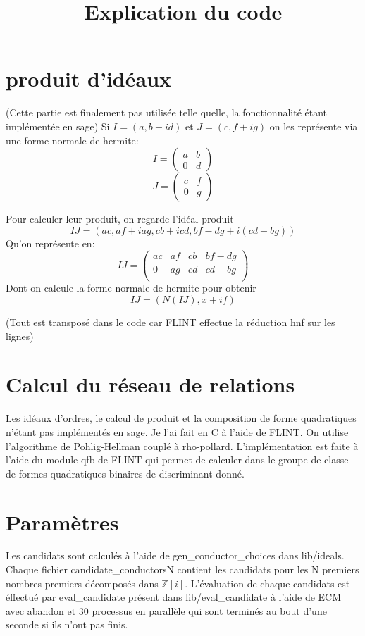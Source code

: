 \documentclass[12pt]{article}
\theoremstyle{plain}
\theoremstyle{definition}
\newcommand{\Z}{\mathbb{Z}}
\begin{document}
\title{Explication du code}
\maketitle
\section{produit d'idéaux}
(Cette partie est finalement pas utilisée telle quelle, la fonctionnalité étant implémentée en sage)
Si $I=(a, b+id)$ et $J=(c, f+ig)$ on les représente via une forme normale de hermite:
\[
    I=\begin{pmatrix}a & b\\ 0&d\end{pmatrix}
\]
\[
    J=\begin{pmatrix}c & f\\ 0&g\end{pmatrix}
\]

Pour calculer leur produit, on regarde l'idéal produit 
\[
    IJ=(ac, af+iag, cb+icd, bf-dg+i(cd+bg))
\]
Qu'on représente en:
\[
    IJ=\begin{pmatrix}ac & af & cb & bf-dg\\
        0 & ag & cd & cd+bg\\
    \end{pmatrix}
\]
Dont on calcule la forme normale de hermite pour obtenir 
\[IJ=(N(IJ), x+if)\]

(Tout est transposé dans le code car FLINT effectue la réduction 
hnf sur les lignes)

\section{Calcul du réseau de relations}
Les idéaux d'ordres, le calcul de produit et la composition de forme quadratiques n'étant pas implémentés 
en sage. Je l'ai fait en C à l'aide de FLINT.
On utilise l'algorithme de Pohlig-Hellman couplé à rho-pollard. L'implémentation 
est faite à l'aide du module qfb de FLINT qui permet de calculer dans le groupe de classe de 
formes quadratiques binaires de discriminant donné.

\section{Paramètres}
Les candidats sont calculés à l'aide de 
gen\_conductor\_choices dans lib/ideals. Chaque 
fichier candidate\_conductorsN contient les 
candidats pour les N premiers nombres 
premiers décomposés dans $\Z[i]$. L'évaluation 
de chaque candidats est éffectué par 
eval\_candidate présent dans lib/eval\_candidate
à l'aide de ECM avec abandon et 30 processus 
en parallèle qui sont terminés au bout d'une seconde 
si ils n'ont pas finis. 
\end{document}
